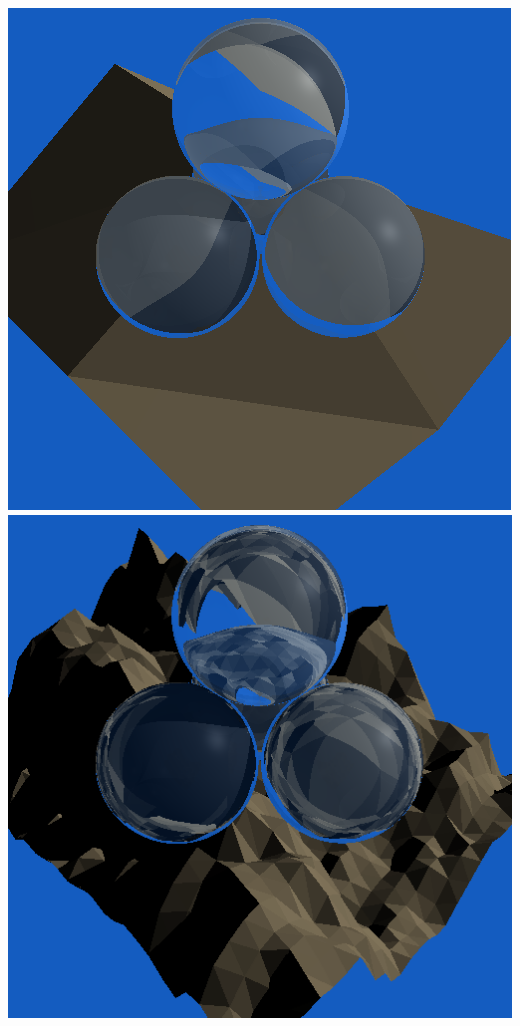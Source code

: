 \documentclass{article}
\begin{document}
        \centering
        \includegraphics[scale=0.27]{mount_low}
        \includegraphics[scale=0.27]{mount_med} 
\end{document}

